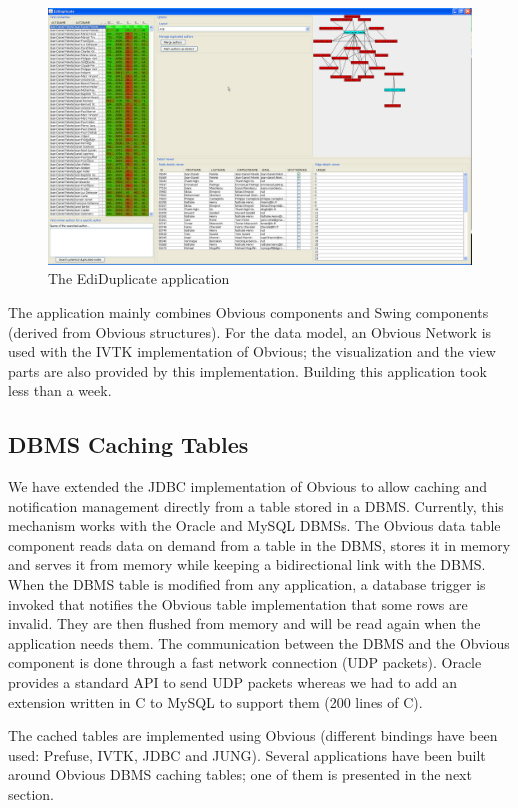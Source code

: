 \begin{figure}[!h]
\centering
\includegraphics[width=0.9\columnwidth]{figures/ediduplicate}
\caption{The EdiDuplicate application}
\label{fig:ediduplicate}
\end{figure}

The application mainly combines Obvious components and Swing
components (derived from Obvious structures). For the data model, an
Obvious Network is used with the IVTK implementation of Obvious; the
visualization and the view parts are also provided by this
implementation.  Building this application took less than a week.

\subsection{DBMS Caching Tables}
\label{dbmscachingtable}

We have extended the JDBC implementation of Obvious to allow caching
and notification management directly from a table stored in a DBMS.
Currently, this mechanism works with the Oracle and MySQL DBMSs.  The
Obvious data table component reads data on demand from a table in the
DBMS, stores it in memory and serves it from memory while keeping a
bidirectional link with the DBMS.  When the DBMS table is modified
from any application, a database trigger is invoked that notifies the
Obvious table implementation that some rows are invalid.  They are
then flushed from memory and will be read again when the application
needs them.  The communication between the DBMS and the Obvious
component is done through a fast network connection (UDP packets).
Oracle provides a standard API to send UDP packets whereas we had to
add an extension written in C to MySQL to support them (200 lines of
C).

The cached tables are implemented using Obvious (different bindings
have been used: Prefuse, IVTK, JDBC and JUNG). Several applications
have been built around Obvious DBMS caching tables; one of them is
presented in the next section.  

